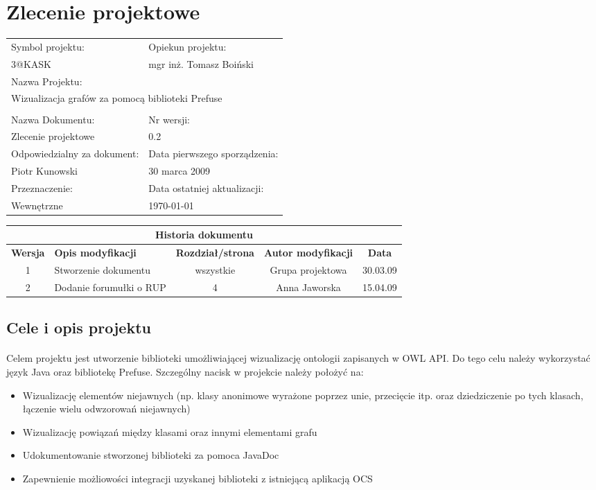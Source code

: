

\section{Zlecenie projektowe }

\begin{center}
\begin{tabular}{|p{7cm}|p{7cm}|}
\hline
Symbol projektu: & Opiekun projektu:   \tabularnewline
3@KASK & mgr inż. Tomasz Boiński    \tabularnewline \hline
\multicolumn{2}{|l|}{Nazwa Projektu: } \tabularnewline
\multicolumn{2}{|l|}{Wizualizacja grafów za pomocą biblioteki Prefuse} \tabularnewline
\hline
\multicolumn{2}{l}{ } \tabularnewline %
\hline
Nazwa Dokumentu: & Nr wersji:   \tabularnewline
Zlecenie projektowe & 0.2 \tabularnewline \hline
Odpowiedzialny za dokument: & Data pierwszego sporządzenia:   \tabularnewline
Piotr Kunowski & 30 marca 2009 \tabularnewline \hline
Przeznaczenie: & Data ostatniej aktualizacji:   \tabularnewline
Wewnętrzne & \today \tabularnewline \hline
\end{tabular}
\end{center}

\begin{center}
\begin{tabular}{|c|p{4cm}|c|c|c|}
\multicolumn{5}{c}{\textbf{Historia dokumentu}} \tabularnewline \hline
\textbf{Wersja} & \textbf{Opis modyfikacji} & \textbf{Rozdział/strona} & \textbf{Autor modyfikacji} & \textbf{Data} \tabularnewline \hline
1 & Stworzenie dokumentu & wszystkie & Grupa projektowa & 30.03.09 \tabularnewline \hline
2 & Dodanie forumułki o RUP   & 4   & Anna Jaworska & 15.04.09\tabularnewline \hline
\end{tabular}


\end{center}



\subsection{Cele i opis projektu}
\paragraph{} Celem projektu jest utworzenie biblioteki umożliwiającej wizualizację ontologii zapisanych w OWL API. Do tego celu należy wykorzystać język Java oraz bibliotekę Prefuse. Szczególny nacisk w projekcie należy położyć na:
\begin{itemize}
 \item Wizualizację elementów niejawnych (np. klasy anonimowe wyrażone
poprzez unie, przecięcie itp. oraz dziedziczenie po tych klasach,
łączenie wielu odwzorowań niejawnych)
\item  Wizualizację powiązań między klasami oraz innymi elementami grafu
\item  Udokumentowanie stworzonej biblioteki za pomoca JavaDoc
\item  Zapewnienie możliowości integracji uzyskanej biblioteki z istniejącą aplikacją OCS
\end{itemize}

